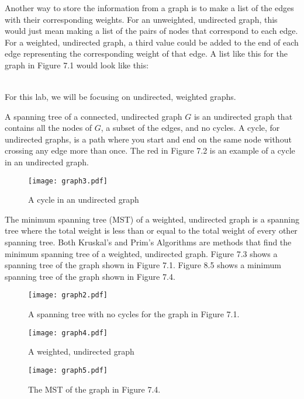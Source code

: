 Another way to store the information from a graph is to make a list of the edges with their corresponding weights.
For an unweighted, undirected graph, this would just mean making a list of the pairs of nodes that correspond to each edge.
For a weighted, undirected graph, a third value could be added to the end of each edge representing the corresponding weight of that edge.
A list like this for the graph in Figure 7.1 would look like this:

\begin{align*}
[('A', 'B'),
 ('B', 'C'),
 ('B', 'F'),
 ('C', 'D'),\\
 ('C', 'E'),
 ('C', 'F'),
 ('D', 'E'),
 ('E', 'F')]
\end{align*}

For this lab, we will be focusing on undirected, weighted graphs.

A spanning tree of a connected, undirected graph $G$ is an undirected graph that contains all the nodes of $G$, a subset of the edges, and no cycles.
A cycle, for undirected graphs, is a path where you start and end on the same node without crossing any edge more than once.
The red in Figure 7.2 is an example of a cycle in an undirected graph.

\begin{figure}[H]
\texttt{[image: graph3.pdf]}
\caption{A cycle in an undirected graph}
\label{mst:graph3}
\end{figure}

The minimum spanning tree (MST) of a weighted, undirected graph is a spanning tree where the total weight is less than or equal to the total weight of every other spanning tree.
Both Kruskal's and Prim's Algorithms are methods that find the minimum spanning tree of a weighted, undirected graph.
Figure 7.3 shows a spanning tree of the graph shown in Figure 7.1.
Figure 8.5 shows a minimum spanning tree of the graph shown in Figure 7.4.

\begin{figure}[H]
\texttt{[image: graph2.pdf]}
\caption{A spanning tree with no cycles for the graph in Figure 7.1.}
\label{mst:graph2}
\end{figure}

\begin{figure}[H]
\texttt{[image: graph4.pdf]}
\caption{A weighted, undirected graph}
\label{mst:graph4}
\end{figure}

\begin{figure}[H]
\texttt{[image: graph5.pdf]}
\caption{The MST of the graph in Figure 7.4.}
\end{figure}

